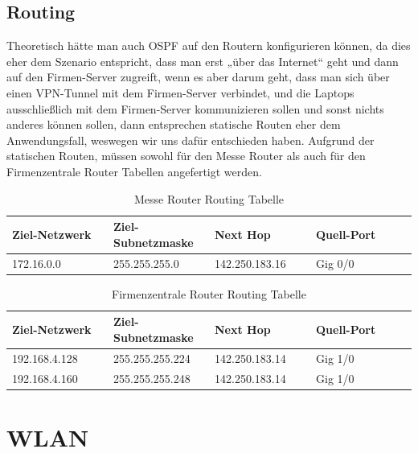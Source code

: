 \subsection{Routing}
Theoretisch hätte man auch OSPF auf den Routern konfigurieren können, da dies eher dem Szenario entspricht, dass man erst „über das Internet“ geht und dann auf den Firmen-Server zugreift, wenn es aber darum geht, dass man sich über einen VPN-Tunnel mit dem Firmen-Server verbindet, und die Laptops ausschließlich mit dem Firmen-Server kommunizieren sollen und sonst nichts anderes können sollen, dann entsprechen statische Routen eher dem Anwendungsfall, weswegen wir uns dafür entschieden haben. Aufgrund der statischen Routen, müssen sowohl für den Messe Router als auch für den Firmenzentrale Router Tabellen angefertigt werden.

\begin{table}[h]
	\centering
	\begin{tabular}{p{0.25\linewidth}|p{0.25\linewidth}|p{0.25\linewidth}|p{0.25\linewidth}}
		Ziel-Netzwerk & Ziel-Subnetzmaske & Next Hop & Quell-Port \\ \hline
		172.16.0.0 & 255.255.255.0 & 142.250.183.16 & Gig 0/0
	\end{tabular}
	\caption{Messe Router Routing Tabelle}
\end{table}

\begin{table}[h]
	\centering
	\begin{tabular}{p{0.25\linewidth}|p{0.25\linewidth}|p{0.25\linewidth}|p{0.25\linewidth}}
		Ziel-Netzwerk & Ziel-Subnetzmaske & Next Hop & Quell-Port \\ \hline
		192.168.4.128 & 255.255.255.224 & 142.250.183.14 & Gig 1/0 \\ \hline
		192.168.4.160 & 255.255.255.248 & 142.250.183.14 & Gig 1/0
	\end{tabular}
	\caption{Firmenzentrale Router Routing Tabelle}
\end{table}

\section{WLAN}
